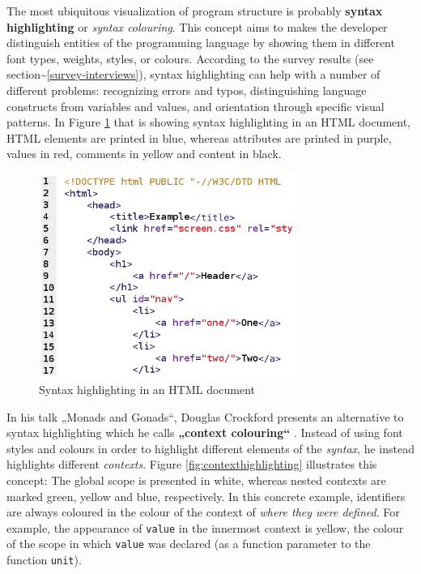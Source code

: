 The most ubiquitous visualization of program structure is probably
\textbf{syntax highlighting} or \emph{syntax colouring}. This concept
aims to makes the developer distinguish entities of the programming
language by showing them in different font types, weights, styles, or
colours. According to the survey results (see
section\textasciitilde{}\ref{survey-interviews}), syntax highlighting
can help with a number of different problems: recognizing errors and
typos, distinguishing language constructs from variables and values, and
orientation through specific visual patterns. In Figure
\ref{fig:syntaxhighlighting} that is showing syntax highlighting in an
HTML document, HTML elements are printed in blue, whereas attributes are
printed in purple, values in red, comments in yellow and content in
black.

\begin{figure}[htbp]
\centering
\includegraphics[keepaspectratio,width=0.75\textwidth,height=0.75\textheight]{img/syntax_highlighting.png}
\caption{Syntax highlighting in an HTML document}
\label{fig:syntaxhighlighting}
\end{figure}

In his talk „Monads and Gonads“, Douglas Crockford presents an
alternative to syntax highlighting which he calls \textbf{„context
colouring“} \citeyear{crockford}. Instead of using font styles and
colours in order to highlight different elements of the \emph{syntax},
he instead highlights different \emph{contexts}. Figure
\ref{fig:contexthighlighting} illustrates this concept: The global scope
is presented in white, whereas nested contexts are marked green, yellow
and blue, respectively. In this concrete example, identifiers are always
coloured in the colour of the context of \emph{where they were defined}.
For example, the appearance of \texttt{value} in the innermost context
is yellow, the colour of the scope in which \texttt{value} was declared
(as a function parameter to the function \texttt{unit}).

